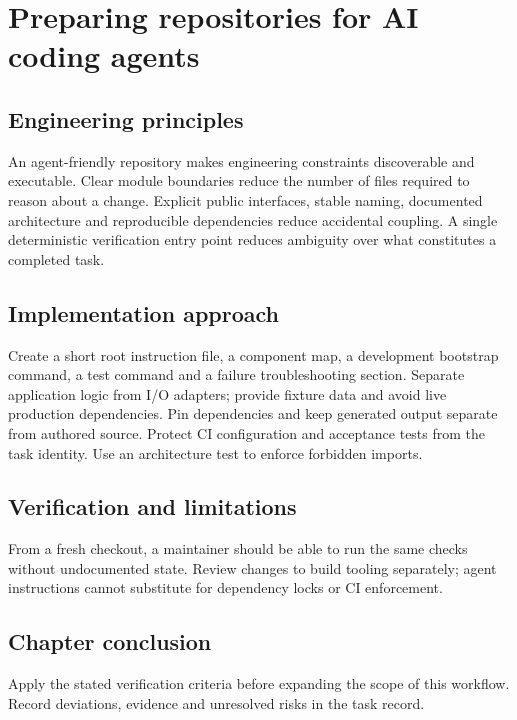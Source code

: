 \chapter{Preparing repositories for AI coding agents}

\section{Engineering principles}

An agent-friendly repository makes engineering constraints discoverable and executable. Clear module boundaries reduce the number of files required to reason about a change. Explicit public interfaces, stable naming, documented architecture and reproducible dependencies reduce accidental coupling. A single deterministic verification entry point reduces ambiguity over what constitutes a completed task.

\section{Implementation approach}

Create a short root instruction file, a component map, a development bootstrap command, a test command and a failure troubleshooting section. Separate application logic from I/O adapters; provide fixture data and avoid live production dependencies. Pin dependencies and keep generated output separate from authored source. Protect CI configuration and acceptance tests from the task identity. Use an architecture test to enforce forbidden imports.

\section{Verification and limitations}

From a fresh checkout, a maintainer should be able to run the same checks without undocumented state. Review changes to build tooling separately; agent instructions cannot substitute for dependency locks or CI enforcement.

\section{Chapter conclusion}

Apply the stated verification criteria before expanding the scope of this workflow. Record deviations, evidence and unresolved risks in the task record.
